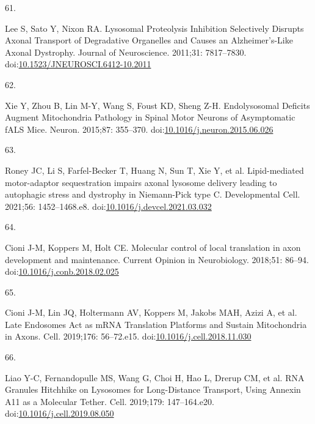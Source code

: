 \documentclass[
  12pt,
  a4paper,
]{book}
\newlength{\cslhangindent}
\newlength{\csllabelwidth}
\newlength{\cslentryspacingunit} %
\newenvironment{CSLReferences}[2] %
 {%
  \setlength{\parindent}{0pt}
  \ifodd #1
  \let\oldpar\par
  \def\par{\hangindent=\cslhangindent\oldpar}
  \fi
  \setlength{\parskip}{#2\cslentryspacingunit}
 }%
 {}
\newcommand{\CSLLeftMargin}[1]{\parbox[t]{\csllabelwidth}{#1}}
\newcommand{\CSLRightInline}[1]{\parbox[t]{\linewidth - \csllabelwidth}{#1}\break}
\begin{document}
\begin{CSLReferences}{0}{0}
\leavevmode{}%
\CSLLeftMargin{61. }%
\CSLRightInline{Lee S, Sato Y, Nixon RA. Lysosomal {Proteolysis Inhibition Selectively Disrupts Axonal Transport} of {Degradative Organelles} and {Causes} an {Alzheimer}'s-{Like Axonal Dystrophy}. Journal of Neuroscience. 2011;31: 7817--7830. doi:\href{https://doi.org/10.1523/JNEUROSCI.6412-10.2011}{10.1523/JNEUROSCI.6412-10.2011}}

\leavevmode{}%
\CSLLeftMargin{62. }%
\CSLRightInline{Xie Y, Zhou B, Lin M-Y, Wang S, Foust KD, Sheng Z-H. Endolysosomal {Deficits Augment Mitochondria Pathology} in {Spinal Motor Neurons} of {Asymptomatic fALS Mice}. Neuron. 2015;87: 355--370. doi:\href{https://doi.org/10.1016/j.neuron.2015.06.026}{10.1016/j.neuron.2015.06.026}}

\leavevmode{}%
\CSLLeftMargin{63. }%
\CSLRightInline{Roney JC, Li S, Farfel-Becker T, Huang N, Sun T, Xie Y, et al. Lipid-mediated motor-adaptor sequestration impairs axonal lysosome delivery leading to autophagic stress and dystrophy in {Niemann-Pick} type {C}. Developmental Cell. 2021;56: 1452--1468.e8. doi:\href{https://doi.org/10.1016/j.devcel.2021.03.032}{10.1016/j.devcel.2021.03.032}}

\leavevmode{}%
\CSLLeftMargin{64. }%
\CSLRightInline{Cioni J-M, Koppers M, Holt CE. Molecular control of local translation in axon development and maintenance. Current Opinion in Neurobiology. 2018;51: 86--94. doi:\href{https://doi.org/10.1016/j.conb.2018.02.025}{10.1016/j.conb.2018.02.025}}

\leavevmode{}%
\CSLLeftMargin{65. }%
\CSLRightInline{Cioni J-M, Lin JQ, Holtermann AV, Koppers M, Jakobs MAH, Azizi A, et al. Late {Endosomes Act} as {mRNA Translation Platforms} and {Sustain Mitochondria} in {Axons}. Cell. 2019;176: 56--72.e15. doi:\href{https://doi.org/10.1016/j.cell.2018.11.030}{10.1016/j.cell.2018.11.030}}

\leavevmode{}%
\CSLLeftMargin{66. }%
\CSLRightInline{Liao Y-C, Fernandopulle MS, Wang G, Choi H, Hao L, Drerup CM, et al. {RNA Granules Hitchhike} on {Lysosomes} for {Long-Distance Transport}, {Using Annexin A11} as a {Molecular Tether}. Cell. 2019;179: 147--164.e20. doi:\href{https://doi.org/10.1016/j.cell.2019.08.050}{10.1016/j.cell.2019.08.050}}


\end{CSLReferences}
\end{document}
